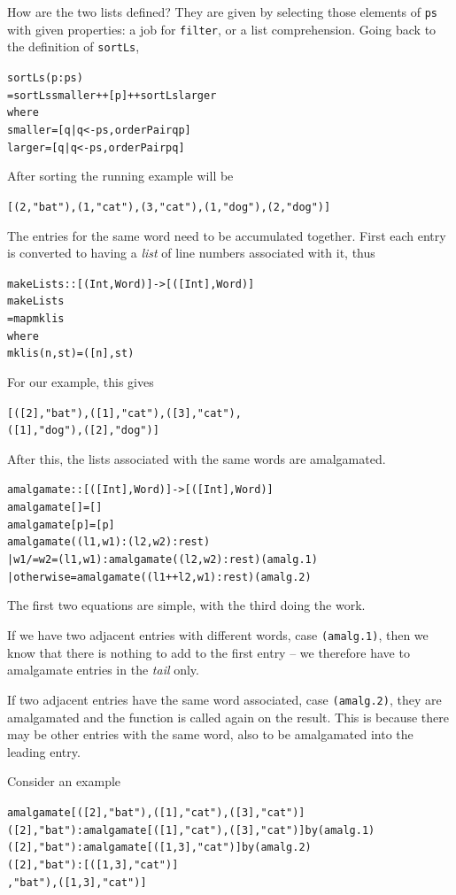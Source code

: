 How are the two lists defined? They are given by selecting those elements of
\texttt{ps} with given properties: a job for \texttt{filter}, or a list
comprehension. Going back to the definition of \texttt{sortLs},
\begin{alltt}
sortLs (p:ps)
  = sortLs smaller ++ [p] ++ sortLs larger
    where
    smaller = [ q | q<-ps , orderPair q p ]
    larger  = [ q | q<-ps , orderPair p q ]
\end{alltt}
After sorting the running example will be
\begin{alltt}
[(2,"bat") , (1,"cat") , (3,"cat") , (1,"dog") , (2,"dog")]
\end{alltt}
The entries for the same word need to be accumulated together.
First each entry is converted to having a {\em list\/} of line numbers associated with
it, thus
\begin{alltt}
makeLists ::  [ (Int,Word) ] -> [ ([Int],Word) ]
makeLists 
  = map mklis 
    where
    mklis ( n , st ) = ( [n] , st )
\end{alltt}
For our example, this gives
\begin{alltt}
[ ([2],"bat") , ([1],"cat") , ([3],"cat") , 
  ([1],"dog") , ([2],"dog") ]
\end{alltt}
After this, the lists associated with the same words are amalgamated.
\begin{alltt}
amalgamate :: [ ([Int],Word) ] -> [ ([Int],Word) ]
\bl
amalgamate [] = []
amalgamate [p] = [p]
amalgamate ((l1,w1):(l2,w2):rest)
  | w1 /= w2    = (l1,w1) : amalgamate ((l2,w2):rest)\hfill(amalg.1)  
  | otherwise   = amalgamate ((l1++l2,w1):rest)\hfill(amalg.2)
\end{alltt}
The first two equations are simple, with the third doing the work. 
\begin{titemize}
\item If we have two
adjacent entries with different words, case \texttt{(amalg.1)}, then we 
know that there is nothing to add to the first entry -- we therefore have to
amalgamate entries in the {\em tail\/} only.
\item If two adjacent entries have the same word associated, case \texttt{(amalg.2)},
they are amalgamated and the function is called again on the result. This is
because there may be other entries with the same word, also to be amalgamated
into the leading entry.
\end{titemize}
Consider an example 
\begin{alltt}
amalgamate [ ([2],"bat") , ([1],"cat") , ([3],"cat") ]
\step ([2],"bat") : amalgamate [([1],"cat"),([3],"cat")]\hfill\textrm{by} (amalg.1)
\step ([2],"bat") : amalgamate [ ([1,3],"cat") ] \hfill\textrm{by} (amalg.2)
\step ([2],"bat") : [ ([1,3],"cat") ]
\step [ ([2],"bat") , ([1,3],"cat") ]
\end{alltt}
